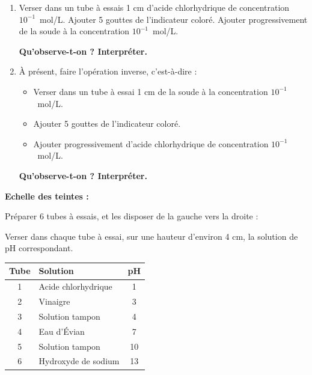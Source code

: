 \documentclass[11pt,a4paper]{article}
\newcommand{\cadreblanc}[1]{%
\medskip\framebox[\linewidth][c]{%
\rule{0mm}{#1mm}}\par
\medskip}
\begin{document}
\vspace{3mm}

\begin{enumerate}[label=\textbf{\arabic*.}]

  \item Verser dans un tube à essais 1 cm d'acide chlorhydrique de concentration $10^{-1}$~mol/L. Ajouter 5 gouttes de l'indicateur coloré. Ajouter progressivement de la soude à la concentration $10^{-1}$~mol/L.

  \vspace{2mm}
  \textbf{Qu'observe-t-on ? Interpréter.}

  \cadreblanc{30}

  \item À présent, faire l'opération inverse, c'est-à-dire :
  \begin{itemize}
    \item Verser dans un tube à essai 1 cm de la soude à la concentration $10^{-1}$~mol/L.
    \item Ajouter 5 gouttes de l'indicateur coloré.
    \item Ajouter progressivement d'acide chlorhydrique de concentration $10^{-1}$~mol/L.
  \end{itemize}

  \vspace{2mm}
  \textbf{Qu'observe-t-on ? Interpréter.}

  \cadreblanc{30}

\end{enumerate}

\vspace{3mm}

\textbf{Echelle des teintes :}

\vspace{3mm}

Préparer 6 tubes à essais, et les disposer de la gauche vers la droite :

\vspace{2mm}

Verser dans chaque tube à essai, sur une hauteur d'environ 4 cm, la solution de pH correspondant.

\vspace{3mm}

\begin{center}
\begin{tabular}{|c|l|c|}
\hline
\textbf{Tube} & \textbf{Solution} & \textbf{pH} \\
\hline
1 & Acide chlorhydrique & 1 \\
\hline
2 & Vinaigre & 3 \\
\hline
3 & Solution tampon & 4 \\
\hline
4 & Eau d'Évian & 7 \\
\hline
5 & Solution tampon & 10 \\
\hline
6 & Hydroxyde de sodium & 13 \\
\hline
\end{tabular}
\end{center}
\end{document}
